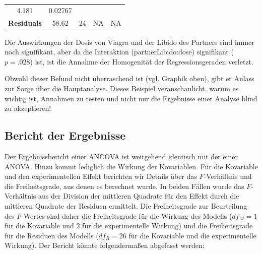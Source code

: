 \documentclass[]{article}
\begin{document}
\begin{longtable}[]{@{}ccccc@{}}
\begin{minipage}[t]{0.12\columnwidth}
4.181\strut
\end{minipage} & \begin{minipage}[t]{0.13\columnwidth}\centering\strut
0.02767\strut
\end{minipage}\tabularnewline
\begin{minipage}[t]{0.30\columnwidth}\centering\strut
\textbf{Residuals}\strut
\end{minipage} & \begin{minipage}[t]{0.11\columnwidth}\centering\strut
58.62\strut
\end{minipage} & \begin{minipage}[t]{0.06\columnwidth}\centering\strut
24\strut
\end{minipage} & \begin{minipage}[t]{0.12\columnwidth}\centering\strut
NA\strut
\end{minipage} & \begin{minipage}[t]{0.13\columnwidth}\centering\strut
NA\strut
\end{minipage}\tabularnewline
\bottomrule
\end{longtable}

Die Auswirkungen der Dosis von Viagra und der Libido des Partners sind
immer noch signifikant, aber da die Interaktion (partnerLibido:dose)
signifikant (\(p = .028\)) ist, ist die Annahme der Homogenität der
Regressionsgeraden verletzt.

Obwohl dieser Befund nicht überraschend ist (vgl. Graphik oben), gibt er
Anlass zur Sorge über die Hauptanalyse. Dieses Beispiel veranschaulicht,
warum es wichtig ist, Annahmen zu testen und nicht nur die Ergebnisse
einer Analyse blind zu akzeptieren!

\subsection*{Bericht der Ergebnisse}\label{bericht-der-ergebnisse}

Der Ergebnissbericht einer ANCOVA ist weitgehend identisch mit der einer
ANOVA. Hinzu kommt lediglich die Wirkung der Kovariablen. Für die
Kovariable und den experimentellen Effekt berichten wir Details über das
\(F\)-Verhältnis und die Freiheitsgrade, aus denen es berechnet wurde.
In beiden Fällen wurde das \(F\)-Verhältnis aus der Division der
mittleren Quadrate für den Effekt durch die mittleren Quadrate der
Residuen ermittelt. Die Freiheitsgrade zur Beurteilung des \(F\)-Wertes
sind daher die Freiheitsgrade für die Wirkung des Modells (\(df_M = 1\)
für die Kovariable und \(2\) für die experimentelle Wirkung) und die
Freiheitsgrade für die Residuen des Modells (\(df_R = 26\) für die
Kovariable und die experimentelle Wirkung). Der Bericht könnte
folgendermaßen abgefasst werden:
\end{document}
